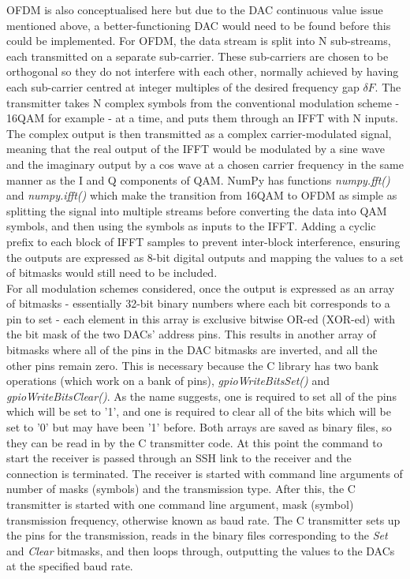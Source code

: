 \documentclass[../main.tex]{subfiles}
\begin{document}
OFDM is also conceptualised here but due to the DAC continuous value issue mentioned above, a better-functioning DAC would need to be found before this could be implemented.
For OFDM, the data stream is split into N sub-streams, each transmitted on a separate sub-carrier.
These sub-carriers are chosen to be orthogonal so they do not interfere with each other, normally achieved by having each sub-carrier centred at integer multiples of the desired frequency gap $\delta F$.
The transmitter takes N complex symbols from the conventional modulation scheme - 16QAM for example - at a time, and puts them through an IFFT  with N inputs.
The complex output is then transmitted as a complex carrier-modulated signal, meaning that the real output of the IFFT would be modulated by a sine wave and the imaginary output by a cos wave at a chosen carrier frequency in the same manner as the I and Q components of QAM.
NumPy has functions \textit{numpy.fft()} and \textit{numpy.ifft()} which make the transition from 16QAM to OFDM as simple as splitting the signal into multiple streams before converting the data into QAM symbols, and then using the symbols as inputs to the IFFT.
Adding a cyclic prefix to each block of IFFT samples to prevent inter-block interference, ensuring the outputs are expressed as 8-bit digital outputs and mapping the values to a set of bitmasks would still need to be included.\\

For all modulation schemes considered, once the output is expressed as an array of bitmasks - essentially 32-bit binary numbers where each bit corresponds to a pin to set - each element in this array is exclusive bitwise OR-ed (XOR-ed) with the bit mask of the two DACs' address pins.
This results in another array of bitmasks where all of the pins in the DAC bitmasks are inverted, and all the other pins remain zero.
This is necessary because the C library has two bank operations (which work on a bank of pins), \textit{gpioWrite\textunderscore Bits\textunderscore Set()} and \textit{gpioWrite\textunderscore Bits\textunderscore Clear()}.
As the name suggests, one is required to set all of the pins which will be set to '1', and one is required to clear all of the bits which will be set to '0' but may have been '1' before.
Both arrays are saved as binary files, so they can be read in by the C transmitter code.
At this point the command to start the receiver is passed through an SSH link to the receiver and the connection is terminated.
The receiver is started with command line arguments of number of masks (symbols) and the transmission type.
After this, the C transmitter is started with one command line argument, mask (symbol) transmission frequency, otherwise known as baud rate.
The C transmitter sets up the pins for the transmission, reads in the binary files corresponding to the \textit{Set} and \textit{Clear} bitmasks, and then loops through, outputting the values to the DACs at the specified baud rate.\\
\end{document}
